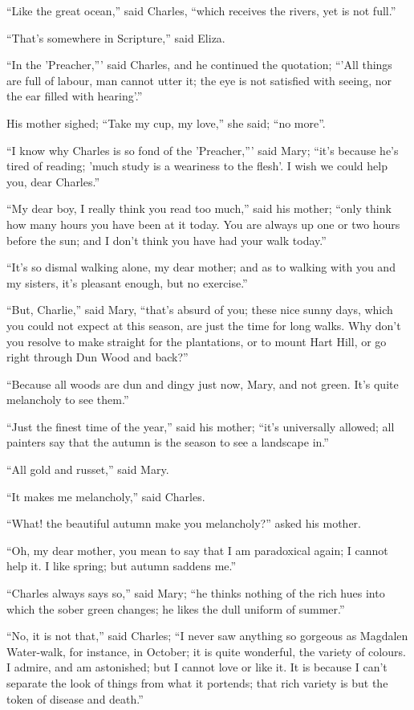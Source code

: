 ``Like the great ocean,'' said Charles, ``which
receives the rivers, yet is not full.''

``That's somewhere in Scripture,'' said Eliza.

``In the 'Preacher,''' said Charles, and he continued the
quotation; ``'All things are full of labour, man cannot utter it;
the eye is not satisfied with seeing, nor the ear filled with
hearing'.''

His mother sighed; ``Take my cup, my love,'' she said;
``no more''.

``I know why Charles is so fond of the 'Preacher,''' said
Mary; ``it's because he's tired of reading; 'much study is a
weariness to the flesh'. I wish we could help you, dear Charles.''

``My dear boy, I really think you read too much,'' said his
mother; ``only think how many hours you have been at it today. You
are always up one or two hours before the sun; and I don't think you
have had your walk today.''

``It's so dismal walking alone, my dear mother; and as to
walking with you and my sisters, it's pleasant enough, but no
exercise.''

``But, Charlie,'' said Mary, ``that's absurd of you;
these nice sunny days, which you could not expect at this season, are
just the time for long walks. Why don't you resolve to make
straight for the plantations, or to mount Hart Hill, or go right
through Dun Wood and back?''

``Because all woods are dun and dingy just now, Mary, and not
green. It's quite melancholy to see them.''

``Just the finest time of the year,'' said his mother;
``it's universally allowed; all painters say that the autumn is
the season to see a landscape in.''

``All gold and russet,'' said Mary.

``It makes me melancholy,'' said Charles.

``What! the beautiful autumn make you melancholy?'' asked
his mother.

``Oh, my dear mother, you mean to say that I am paradoxical
again; I cannot help it. I like spring; but autumn saddens me.''

``Charles always says so,'' said Mary; ``he thinks
nothing of the rich hues into which the sober green changes; he likes
the dull uniform of summer.''

``No, it is not that,'' said Charles; ``I never saw
anything so gorgeous as Magdalen Water-walk, for instance, in October;
it is quite wonderful, the variety of colours. I admire, and am
astonished; but I cannot love or like it. It is because I can't
separate the look of things from what it portends; that rich variety
is but the token of disease and death.''


